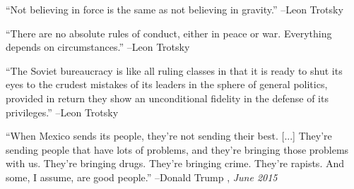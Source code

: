 \documentclass{article}%
\begin{document}
\linebreak%
\vspace{1mm}%
\begin{minipage}{\textwidth}%
\flushleft%
“Not believing in force is the same as not believing in gravity.”%
\linebreak%
\vspace{1mm}%
–Leon Trotsky%
\linebreak%
\vspace{1mm}%
\end{minipage}%
\linebreak%
\vspace{1mm}%
\begin{minipage}{\textwidth}%
\flushleft%
“There are no absolute rules of conduct, either in peace or war. Everything depends on circumstances.”%
\linebreak%
\vspace{1mm}%
–Leon Trotsky%
\linebreak%
\vspace{1mm}%
\end{minipage}%
\linebreak%
\vspace{1mm}%
\begin{minipage}{\textwidth}%
\flushleft%
“The Soviet bureaucracy is like all ruling classes in that it is ready to shut its eyes to the crudest mistakes of its leaders in the sphere of general politics, provided in return they show an unconditional fidelity in the defense of its privileges.”%
\linebreak%
\vspace{1mm}%
–Leon Trotsky%
\linebreak%
\vspace{1mm}%
\end{minipage}%
\linebreak%
\vspace{1mm}%
\begin{minipage}{\textwidth}%
\flushleft%
“When Mexico sends its people, they're not sending their best. {[}...{]} They're sending people that have lots of problems, and they're bringing those problems with us. They're bringing drugs. They're bringing crime. They're rapists. And some, I assume, are good people.”%
\linebreak%
\vspace{1mm}%
–Donald Trump%
, \textit{June 2015}%
\linebreak%
\vspace{1mm}%
\end{minipage}%
\end{document}
